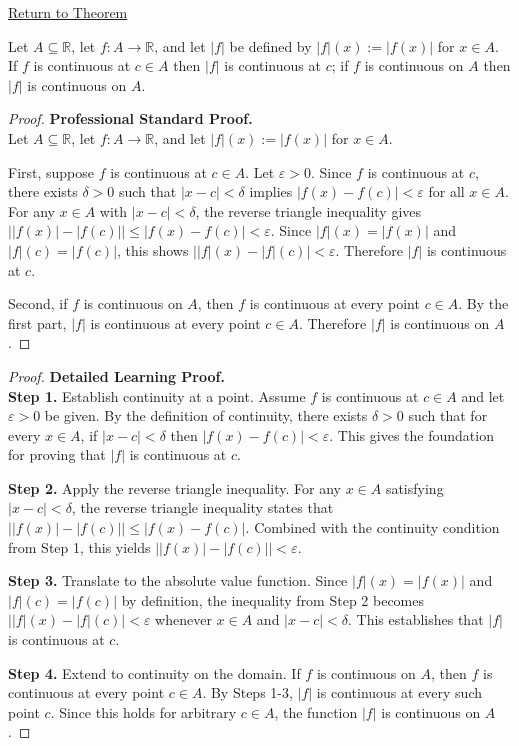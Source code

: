 \newpage
{}
\label{prf:absolute-value-preserves-continuity}

\begin{remark*}[Return]
\hyperref[thm:absolute-value-preserves-continuity]{Return to Theorem}
\end{remark*}

\begin{theorem*}
Let $A \subseteq \mathbb{R}$, let $f : A \to \mathbb{R}$, and let $|f|$ be defined by $|f|(x):=|f(x)|$ for $x\in A$. If $f$ is continuous at $c\in A$ then $|f|$ is continuous at $c$; if $f$ is continuous on $A$ then $|f|$ is continuous on $A$.
\end{theorem*}

\begin{proof}
\textbf{Professional Standard Proof.}~\\
Let $A \subseteq \mathbb{R}$, let $f : A \to \mathbb{R}$, and let $|f|(x):=|f(x)|$ for $x\in A$.

First, suppose $f$ is continuous at $c\in A$. Let $\varepsilon>0$. Since $f$ is continuous at $c$, there exists $\delta>0$ such that $|x-c|<\delta$ implies $|f(x)-f(c)|<\varepsilon$ for all $x\in A$. For any $x\in A$ with $|x-c|<\delta$, the reverse triangle inequality gives $\bigl||f(x)|-|f(c)|\bigr| \le |f(x)-f(c)|<\varepsilon$. Since $|f|(x)=|f(x)|$ and $|f|(c)=|f(c)|$, this shows $\bigl||f|(x)-|f|(c)\bigr|<\varepsilon$. Therefore $|f|$ is continuous at $c$.

Second, if $f$ is continuous on $A$, then $f$ is continuous at every point $c\in A$. By the first part, $|f|$ is continuous at every point $c\in A$. Therefore $|f|$ is continuous on $A$.
\end{proof}

\begin{proof}
\textbf{Detailed Learning Proof.}~\\

\textbf{Step 1.} Establish continuity at a point. Assume $f$ is continuous at $c\in A$ and let $\varepsilon>0$ be given. By the definition of continuity, there exists $\delta>0$ such that for every $x\in A$, if $|x-c|<\delta$ then $|f(x)-f(c)|<\varepsilon$. This gives the foundation for proving that $|f|$ is continuous at $c$.

\textbf{Step 2.} Apply the reverse triangle inequality. For any $x\in A$ satisfying $|x-c|<\delta$, the reverse triangle inequality states that $\bigl||f(x)|-|f(c)|\bigr| \le |f(x)-f(c)|$. Combined with the continuity condition from Step 1, this yields $\bigl||f(x)|-|f(c)|\bigr| < \varepsilon$.

\textbf{Step 3.} Translate to the absolute value function. Since $|f|(x)=|f(x)|$ and $|f|(c)=|f(c)|$ by definition, the inequality from Step 2 becomes $\bigl||f|(x)-|f|(c)\bigr|<\varepsilon$ whenever $x\in A$ and $|x-c|<\delta$. This establishes that $|f|$ is continuous at $c$.

\textbf{Step 4.} Extend to continuity on the domain. If $f$ is continuous on $A$, then $f$ is continuous at every point $c\in A$. By Steps 1-3, $|f|$ is continuous at every such point $c$. Since this holds for arbitrary $c\in A$, the function $|f|$ is continuous on $A$.
\end{proof}

